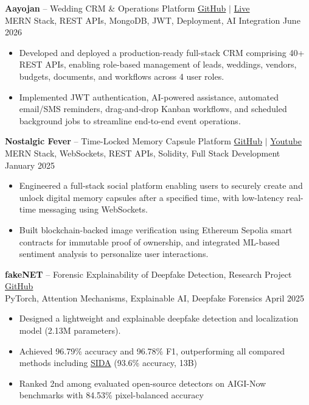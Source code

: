 \documentclass[a4paper,10pt]{article}
\begin{document}
\textbf{Aayojan} -- Wedding CRM \& Operations Platform
\hfill \href{https://github.com/akshatidk29/weddingCRM}{GitHub} $\vert$
\href{https://wed-aayojan.vercel.app}{Live} \\
{\small MERN Stack, REST APIs, MongoDB, JWT, Deployment, AI Integration}
\hfill June 2026
\normalsize
\begin{itemize}[label=--]
    \item Developed and deployed a production-ready full-stack CRM comprising 40+ REST APIs, enabling role-based management of leads, weddings, vendors, budgets, documents, and workflows across 4 user roles.
    \item Implemented JWT authentication, AI-powered assistance, automated email/SMS reminders, drag-and-drop Kanban workflows, and scheduled background jobs to streamline end-to-end event operations.
\end{itemize}


\textbf{Nostalgic Fever} -- Time-Locked Memory Capsule Platform
\hfill \href{https://github.com/akshatidk29/Nostalgic_Fever}{GitHub} $\vert$
\href{https://www.youtube.com/watch?v=AxjyAr-QWfM}{Youtube} \\
{\small MERN Stack, WebSockets, REST APIs, Solidity, Full Stack Development}
\hfill January 2025
\normalsize
\begin{itemize}[label=--]
    \item Engineered a full-stack social platform enabling users to securely create and unlock digital memory capsules after a specified time, with low-latency real-time messaging using WebSockets.
    \item Built blockchain-backed image verification using Ethereum Sepolia smart contracts for immutable proof of ownership, and integrated ML-based sentiment analysis to personalize user interactions.
\end{itemize}


\textbf{fakeNET} -- Forensic Explainability of Deepfake Detection, Research Project
\hfill \href{https://github.com/akshatidk29/fakeNET}{GitHub}  \\
{\small PyTorch, Attention Mechanisms, Explainable AI, Deepfake Forensics}
\hfill April 2025
\normalsize
\begin{itemize}[label=--]
\item Designed a lightweight and explainable deepfake detection and localization model (2.13M parameters).
\item Achieved 96.79\% accuracy and 96.78\% F1, outperforming all compared methods including \href{https://arxiv.org/abs/2412.04292}{SIDA} (93.6\% accuracy, 13B)
\item Ranked 2nd among evaluated open-source detectors on AIGI-Now benchmarks with 84.53\% pixel-balanced accuracy
\end{itemize}
\end{document}
